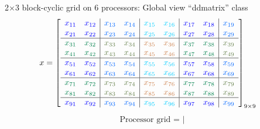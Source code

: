 \begin{frame}[shrink]
\begin{exampleblock}{2$\times$3 block-cyclic grid on 6 processors:
    Global view ``ddmatrix'' class}
\begin{align*}
x &= \left[
      \begin{array}{ll|ll|ll|ll|l}
      \color{g11}x_{11} & \color{g11}x_{12} & \color{g12}x_{13} & \color{g12}x_{14} & \color{g13}x_{15} & \color{g13}x_{16} & \color{g11}x_{17} & \color{g11}x_{18} & \color{g12}x_{19}\\
      \color{g11}x_{21} & \color{g11}x_{22} & \color{g12}x_{23} & \color{g12}x_{24} & \color{g13}x_{25} & \color{g13}x_{26} & \color{g11}x_{27} & \color{g11}x_{28} & \color{g12}x_{29}\\\hline
      \color{g21}x_{31} & \color{g21}x_{32} & \color{g22}x_{33} & \color{g22}x_{34} & \color{g23}x_{35} & \color{g23}x_{36} & \color{g21}x_{37} & \color{g21}x_{38} & \color{g22}x_{39}\\
      \color{g21}x_{41} & \color{g21}x_{42} & \color{g22}x_{43} & \color{g22}x_{44} & \color{g23}x_{45} & \color{g23}x_{46} & \color{g21}x_{47} & \color{g21}x_{48} & \color{g22}x_{49}\\\hline
      \color{g11}x_{51} & \color{g11}x_{52} & \color{g12}x_{53} & \color{g12}x_{54} & \color{g13}x_{55} & \color{g13}x_{56} & \color{g11}x_{57} & \color{g11}x_{58} & \color{g12}x_{59}\\
      \color{g11}x_{61} & \color{g11}x_{62} & \color{g12}x_{63} & \color{g12}x_{64} & \color{g13}x_{65} & \color{g13}x_{66} & \color{g11}x_{67} & \color{g11}x_{68} & \color{g12}x_{69}\\\hline
      \color{g21}x_{71} & \color{g21}x_{72} & \color{g22}x_{73} & \color{g22}x_{74} & \color{g23}x_{75} & \color{g23}x_{76} & \color{g21}x_{77} & \color{g21}x_{78} & \color{g22}x_{79}\\
      \color{g21}x_{81} & \color{g21}x_{82} & \color{g22}x_{83} & \color{g22}x_{84} & \color{g23}x_{85} & \color{g23}x_{86} & \color{g21}x_{87} & \color{g21}x_{88} & \color{g22}x_{89}\\\hline
      \color{g11}x_{91} & \color{g11}x_{92} & \color{g12}x_{93} & \color{g12}x_{94} & \color{g13}x_{95} & \color{g13}x_{96} & \color{g11}x_{97} & \color{g11}x_{98} & \color{g12}x_{99}\\
      \end{array}
\right]_{9\times 9}
\end{align*}
\begin{align*}
\text{Processor grid = }\left|

\end{align*}
\end{exampleblock}
\end{frame}
